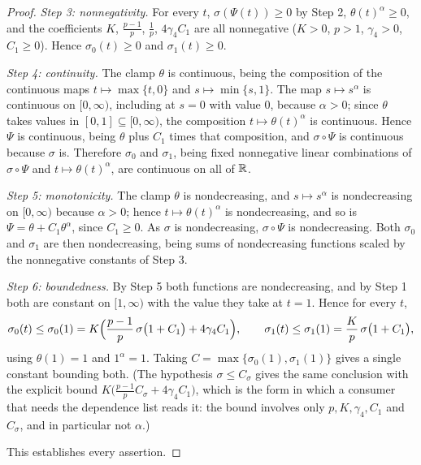 \begin{proof}
\emph{Step 3: nonnegativity.}  For every $t$, $\sigma(\Psi(t))\ge0$ by Step 2,
$\theta(t)^{\alpha}\ge0$, and the coefficients $K$, $\frac{p-1}p$, $\frac1p$,
$4\gamma_4C_1$ are all nonnegative ($K>0$, $p>1$, $\gamma_4>0$, $C_1\ge0$).
Hence $\sigma_0(t)\ge0$ and $\sigma_1(t)\ge0$.

\emph{Step 4: continuity.}  The clamp $\theta$ is continuous, being the
composition of the continuous maps $t\mapsto\max\{t,0\}$ and
$s\mapsto\min\{s,1\}$.  The map $s\mapsto s^{\alpha}$ is continuous on
$[0,\infty)$, including at $s=0$ with value $0$, because $\alpha>0$; since
$\theta$ takes values in $[0,1]\subseteq[0,\infty)$, the composition
$t\mapsto\theta(t)^{\alpha}$ is continuous.  Hence $\Psi$ is continuous, being
$\theta$ plus $C_1$ times that composition, and $\sigma\circ\Psi$ is continuous
because $\sigma$ is.  Therefore $\sigma_0$ and $\sigma_1$, being fixed
nonnegative linear combinations of $\sigma\circ\Psi$ and
$t\mapsto\theta(t)^{\alpha}$, are continuous on all of $\mathbb{R}$.

\emph{Step 5: monotonicity.}  The clamp $\theta$ is nondecreasing, and
$s\mapsto s^{\alpha}$ is nondecreasing on $[0,\infty)$ because $\alpha>0$;
hence $t\mapsto\theta(t)^{\alpha}$ is nondecreasing, and so is
$\Psi=\theta+C_1\theta^{\alpha}$, since $C_1\ge0$.  As $\sigma$ is
nondecreasing, $\sigma\circ\Psi$ is nondecreasing.  Both $\sigma_0$ and
$\sigma_1$ are then nondecreasing, being sums of nondecreasing functions scaled
by the nonnegative constants of Step 3.

\emph{Step 6: boundedness.}  By Step 5 both functions are nondecreasing, and by
Step 1 both are constant on $[1,\infty)$ with the value they take at $t=1$.
Hence for every $t$,
\[
\sigma_0(t)\le\sigma_0(1)
=K\Bigl(\frac{p-1}p\,\sigma\bigl(1+C_1\bigr)+4\gamma_4C_1\Bigr),
\qquad
\sigma_1(t)\le\sigma_1(1)=\frac Kp\,\sigma\bigl(1+C_1\bigr),
\]
using $\theta(1)=1$ and $1^{\alpha}=1$.  Taking
$C=\max\{\sigma_0(1),\sigma_1(1)\}$ gives a single constant bounding both.
(The hypothesis $\sigma\le C_\sigma$ gives the same conclusion with the
explicit bound $K\bigl(\frac{p-1}pC_\sigma+4\gamma_4C_1\bigr)$, which is the
form in which a consumer that needs the dependence list reads it: the bound
involves only $p,K,\gamma_4,C_1$ and $C_\sigma$, and in particular not
$\alpha$.)

This establishes every assertion.
\end{proof}
